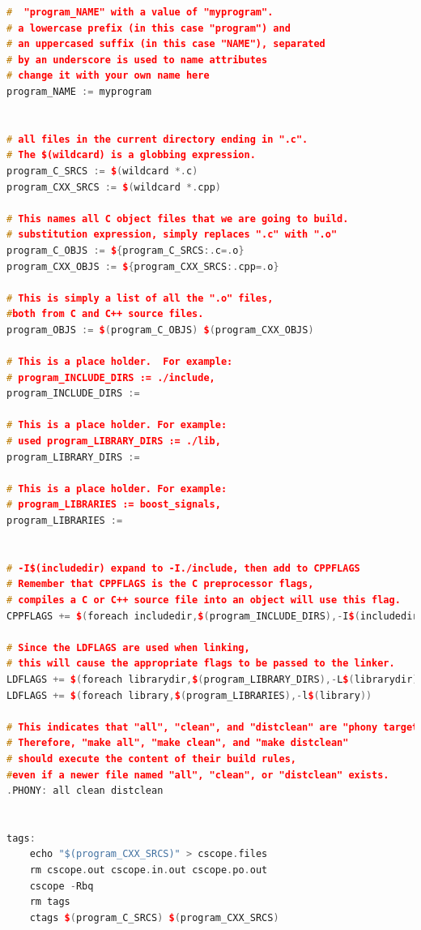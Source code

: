 \documentclass[paper=8.5in:11in, twoside, 12pt, pagesize=pdftex]{book}
\begin{document}
\begin{lstlisting}[frame=single,  basicstyle=\small, language=c++, mathescape=false]
#  "program_NAME" with a value of "myprogram". 
# a lowercase prefix (in this case "program") and 
# an uppercased suffix (in this case "NAME"), separated
# by an underscore is used to name attributes
# change it with your own name here 
program_NAME := myprogram


# all files in the current directory ending in ".c". 
# The $(wildcard) is a globbing expression. 
program_C_SRCS := $(wildcard *.c)
program_CXX_SRCS := $(wildcard *.cpp)

# This names all C object files that we are going to build. 
# substitution expression, simply replaces ".c" with ".o"
program_C_OBJS := ${program_C_SRCS:.c=.o}
program_CXX_OBJS := ${program_CXX_SRCS:.cpp=.o}

# This is simply a list of all the ".o" files, 
#both from C and C++ source files.
program_OBJS := $(program_C_OBJS) $(program_CXX_OBJS)

# This is a place holder.  For example:
# program_INCLUDE_DIRS := ./include, 
program_INCLUDE_DIRS :=

# This is a place holder. For example:
# used program_LIBRARY_DIRS := ./lib, 
program_LIBRARY_DIRS :=

# This is a place holder. For example:
# program_LIBRARIES := boost_signals, 
program_LIBRARIES :=


# -I$(includedir) expand to -I./include, then add to CPPFLAGS
# Remember that CPPFLAGS is the C preprocessor flags, 
# compiles a C or C++ source file into an object will use this flag.
CPPFLAGS += $(foreach includedir,$(program_INCLUDE_DIRS),-I$(includedir))

# Since the LDFLAGS are used when linking, 
# this will cause the appropriate flags to be passed to the linker.
LDFLAGS += $(foreach librarydir,$(program_LIBRARY_DIRS),-L$(librarydir))
LDFLAGS += $(foreach library,$(program_LIBRARIES),-l$(library))

# This indicates that "all", "clean", and "distclean" are "phony targets". 
# Therefore, "make all", "make clean", and "make distclean"
# should execute the content of their build rules, 
#even if a newer file named "all", "clean", or "distclean" exists.
.PHONY: all clean distclean


tags:
	echo "$(program_CXX_SRCS)" > cscope.files 
	rm cscope.out cscope.in.out cscope.po.out 
    cscope -Rbq 
	rm tags
	ctags $(program_C_SRCS) $(program_CXX_SRCS)
	 

\end{lstlisting}
\end{document}
